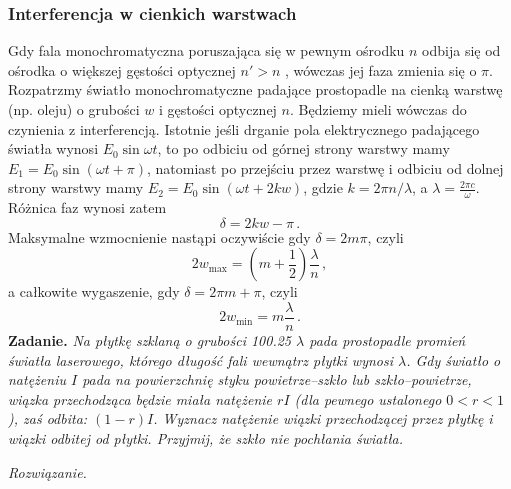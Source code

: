 \documentclass[../main.tex]{subfiles}
\begin{document}
\subsubsection{Interferencja w cienkich warstwach}
Gdy fala monochromatyczna poruszająca się w pewnym ośrodku \(n\) odbija się od ośrodka o większej gęstości optycznej \(n'>n\) , wówczas jej faza zmienia się o \(\pi\). Rozpatrzmy światło monochromatyczne padające prostopadle na cienką warstwę (np. oleju) o grubości \(w\) i gęstości optycznej \(n\). Będziemy mieli wówczas do czynienia z interferencją. Istotnie jeśli drganie pola elektrycznego padającego światła wynosi \(E_0\sin\omega t\), to po odbiciu od górnej strony warstwy mamy \(E_1=E_0\sin(\omega t+\pi)\), natomiast po przejściu przez warstwę i odbiciu od dolnej strony warstwy mamy \(E_2=E_0\sin(\omega t+2kw)\), gdzie \(k=2\pi n/\lambda\), a \(\lambda=\frac{2\pi c}{\omega}\). Różnica faz wynosi zatem
\begin{equation*}
    \delta =2kw-\pi\,.
\end{equation*}
Maksymalne wzmocnienie nastąpi oczywiście gdy \(\delta =2m\pi\), czyli
\begin{equation*}
    2w_\text{max}=\left(m+\frac{1}{2}\right)\frac{\lambda}{n}\,,
\end{equation*}
a całkowite wygaszenie, gdy \(\delta=2\pi m+\pi\), czyli 
\begin{equation*}
    2w_\text{min}=m\frac{\lambda}{n}\,.
\end{equation*}
\textbf{Zadanie.} \textit{Na płytkę szklaną o grubości 100.25 \(\lambda\) pada prostopadle promień światła laserowego, którego długość fali wewnątrz płytki wynosi \(\lambda\). Gdy światło o natężeniu \(I\) pada na powierzchnię styku powietrze--szkło lub szkło--powietrze, wiązka przechodząca będzie miała natężenie \(rI\) (dla pewnego ustalonego \(0<r<1\)), zaś odbita: \((1-r)I\). Wyznacz natężenie wiązki przechodzącej przez płytkę i wiązki odbitej od płytki. Przyjmij, że szkło nie pochłania światła.}
\medskip

\textit{Rozwiązanie.}
\medskip
\end{document}
